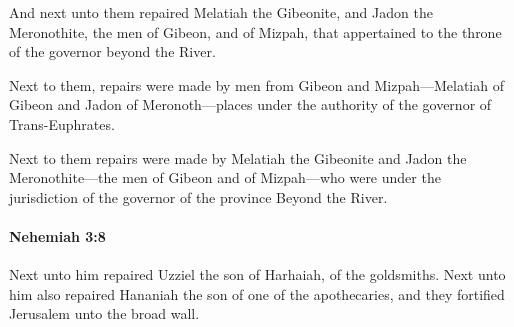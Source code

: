 			\begin{versebox}
					\item[BHS] 
					\item[ASV] And next unto them repaired Melatiah the Gibeonite, and Jadon the Meronothite, the men of Gibeon, and of Mizpah, that appertained to the throne of the governor beyond the River.
					\item[NIV] Next to them, repairs were made by men from Gibeon and Mizpah—Melatiah of Gibeon and Jadon of Meronoth—places under the authority of the governor of Trans-Euphrates.
					\item[NRSV] Next to them repairs were made by Melatiah the Gibeonite and Jadon the Meronothite—the men of Gibeon and of Mizpah—who were under the jurisdiction of the governor of the province Beyond the River.
			\end{versebox}

		\paragraph{Nehemiah 3:8} %
			\label{NEHEMIAH-3-8}

			Next unto him repaired Uzziel the son of Harhaiah, of the goldsmiths. Next unto him also repaired Hananiah the son of one of the apothecaries, and they fortified Jerusalem unto the broad wall.

